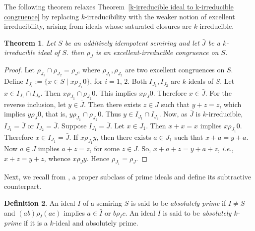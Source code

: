 \documentclass[11pt,english]{amsart}
\newtheorem{theorem}{Theorem}[section]
\newtheorem{proposition}[theorem]{Proposition}
\theoremstyle{definition}
\newtheorem{definition}[theorem]{Definition}
\numberwithin{equation}{section}
\begin{document}
 

 The following theorem relaxes Theorem~\ref{k-irreducible ideal to k-irreducible congruence} by replacing $k$-irreducibility with the weaker notion of excellent irreducibility, arising from ideals whose saturated closures are $k$-irreducible.
 \begin{theorem}
    Let $S$ be an additively idempotent semiring and let $\bar{J}$ be a $k$-irreducible ideal of $S$. then $\rho_J$ is an excellent-irreducible congruence on $S$.
 \end{theorem}
 
 \begin{proof}
     Let $\rho_{J_1}\cap \rho_{J_2}=\rho_J$, where $\rho_{J_1}, \rho_{J_2}$ are two excellent congruences on $S$. Define $I_{J_i}:=\{x\in S \mid x\rho_{J_1}0\}$, for $i=1$, $2$. Both $I_{J_1}, I_{J_2}$ are $k$-ideals of $S$. Let $x\in I_{J_1}\cap I_{J_2}$. Then $x\rho_{J_1}\cap \rho_{J_2}0$. This implies $x\rho_J0$. Therefore $x\in \bar{J}$. For the reverse inclusion, let $y\in \bar{J}$. Then there exists $z\in J$ such that $y+z=z$, which implies $y\rho_J0$, that is, $y\rho_{J_1}\cap \rho_{J_2}0$. Thus $y\in I_{J_1}\cap I_{J_2}$. Now, as $\bar{J}$ is $k$-irreducible, $I_{J_1}=\bar{J}$ or $I_{J_2}=\bar{J}$. Suppose $I_{J_1}=\bar{J}$. Let $x\in J_1$. Then $x+x=x$ implies $x\rho_{J_1}0$. Therefore $x\in I_{J_1}=\bar{J}$. If $x\rho_{J_1}y$, then there exists $a\in J_1$ such that $x+a=y+a$. Now $a\in \bar{J}$ implies $a+z=z$, for some $z\in J$. So, $x+a+z=y+a+z$, \textit{i.e.}, $x+z=y+z$, whence $x\rho_Jy$. Hence $\rho_{J_1}=\rho_J$.
 \end{proof}

Next, we recall from  \cite[Definition 3.10]{Lescot11}, a proper subclass of prime ideals and define its subtractive counterpart. 

 \begin{definition}
 An ideal $I$ of a semiring $S$ is said to be \emph{absolutely prime} if $I\neq S$ and $(ab)\rho_I(ac)$ implies $a\in \bar{I}$ or $b\rho_Ic$.
    An ideal $I$ is said to be \emph{absolutely $k$-prime} if it is a $k$-ideal and absolutely prime.   
 \end{definition}
 
\end{document}
